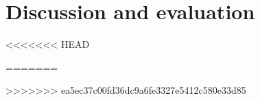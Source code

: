 \section{Discussion and evaluation}
	
	
	
	
<<<<<<< HEAD
    
	

=======
	
	
>>>>>>> ea5ec37c00fd36dc9a6fe3327e5412c580e33d85
